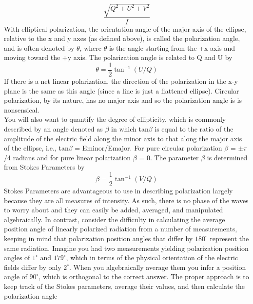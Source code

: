 \documentclass[10pt]{report}
\begin{document}
\begin{equation}
\frac{\sqrt{Q^2+U^2+V^2}}{I}
\end{equation}
With elliptical polarization, the orientation angle of the major axis of the ellipse, relative to the x and y axes (as defined above), is called the polarization angle, and is often denoted by $\theta$, where $\theta$ is the angle starting from the +x axis and moving toward the +y axis.  The polarization angle is related to Q and U by 
\begin{equation}
\theta=\frac{1}{2}\tan^{-1}(U/Q)
\end{equation}
If there is a net linear polarization, the direction of the polarization in the x-y plane is the same as this angle (since a line is just a flattened ellipse).  Circular polarization, by its nature, has no major axis and so the polarization angle is is nonsensical.\\
You will also want to quantify the degree of ellipticity, which is commonly described by an angle denoted as $\beta$ in which tan$\beta$ is equal to the ratio of the amplitude of the electric field along the minor axis to that along the major axis of the ellipse, i.e., tan$\beta$ = Eminor/Emajor.  For pure circular polarization $\beta$ = $\pm \pi$/4 radians and for pure linear polarization $\beta$ = 0.  The parameter $\beta$ is determined from Stokes Parameters by 
\begin{equation}
\beta=\frac{1}{2}\tan^{-1}(V/Q)
\end{equation} 
Stokes Parameters are advantageous to use in describing polarization largely because they are all measures of intensity.  As such, there is no phase of the waves to worry about and they can easily be added, averaged, and manipulated algebraically.  In contrast, consider the difficulty in calculating the average position angle of linearly polarized radiation from a number of measurements, keeping in mind that polarization position angles that differ by $180^\circ$ represent the same radiation.  Imagine you had two measurements yielding polarization position angles of $1^\circ$ and $179^\circ$, which in terms of the physical orientation of the electric fields differ by only $2^\circ$.  When you algebraically average them you infer a position angle of $90^\circ$, which is orthogonal to the correct answer.  The proper approach is to keep track of the Stokes parameters, average their values, and then calculate the polarization angle
\end{document}
